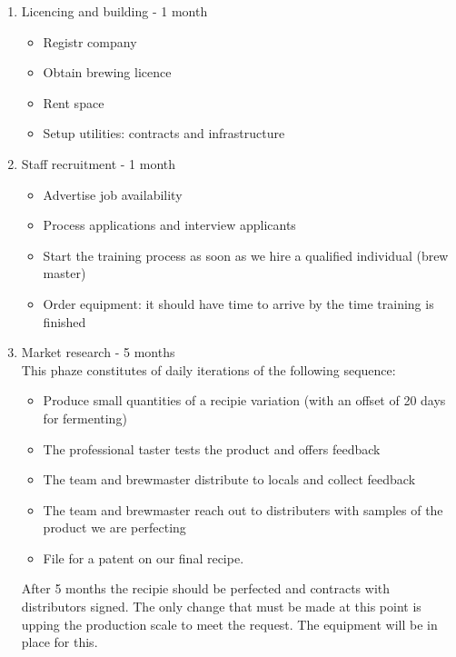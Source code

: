 \documentclass[11pt]{article}
\begin{document}
  \begin{enumerate}
  \item Licencing and building - 1 month
    \begin{itemize}
    \item Registr company
    \item Obtain brewing licence
    \item Rent space
    \item Setup utilities: contracts and infrastructure
    \end{itemize}

  \item Staff recruitment - 1 month
    \begin{itemize}
    \item Advertise job availability
    \item Process applications and interview applicants
    \item Start the training process as soon as we hire a qualified individual (brew master)
    \item Order equipment: it should have time to arrive by the time training is finished
    \end{itemize}

  \item Market research - 5 months\\
  This phaze constitutes of daily iterations of the following sequence:
    \begin{itemize}
    \item Produce small quantities of a recipie variation (with an offset of 20 days for fermenting)
    \item The professional taster tests the product and offers feedback
    \item The team and brewmaster distribute to locals and collect feedback
    \item The team and brewmaster reach out to distributers with samples of the product we are perfecting
    \item File for a patent on our final recipe.
    \end{itemize}
  \noindent After 5 months the recipie should be perfected and contracts with distributors signed. The only change that must be made at this point is upping the production scale to meet the request. The equipment will be in place for this.
  \end{enumerate}
\end{document}
